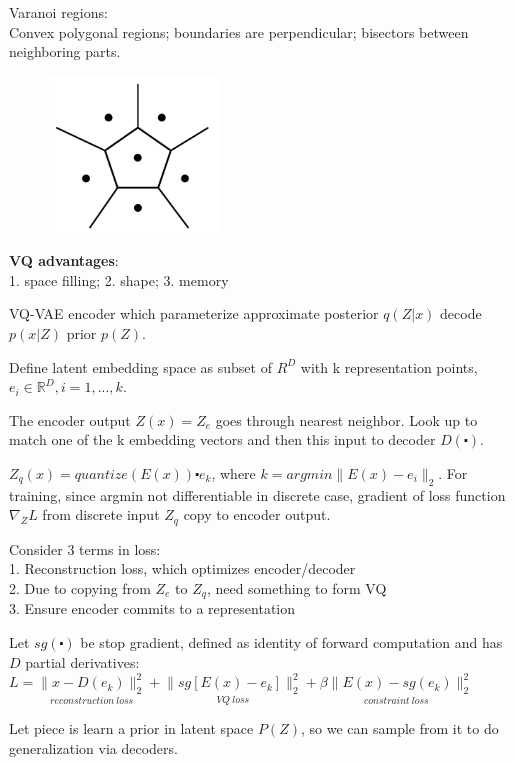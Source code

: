 \documentclass[12pt,a4paper]{article}
\begin{document}
Varanoi regions: \\
Convex polygonal regions; boundaries are perpendicular; bisectors between neighboring parts. 

\begin{figure}[!ht]
\centering
\includegraphics[width=0.4\textwidth]{fig/convex_poly_region.png}
\end{figure}

\textbf{VQ advantages}:\\
1. space filling; 2. shape; 3. memory

VQ-VAE encoder which parameterize approximate posterior $q(Z|x)$ decode $p(x|Z)$ prior $p(Z)$. 

Define latent embedding space as subset of $R^D$ with k representation points, $e_i\in \mathbb{R}^D, i=1,...,k$.

The encoder output $Z(x)=Z_e$ goes through nearest neighbor. Look up to match one of the k embedding vectors and then this input to decoder $D(\centerdot)$.

$Z_q(x)=quantize(E(x))\centerdot e_k$, where $k=argmin\|E(x)-e_i\|_2$. For training, since argmin not differentiable in discrete case, gradient of loss function $\nabla_Z L$ from discrete input $Z_q$ copy to encoder output. 

Consider 3 terms in loss: \\
1. Reconstruction loss, which optimizes encoder/decoder\\
2. Due to copying from $Z_e$ to $Z_q$, need something to form VQ \\
3. Ensure encoder commits to a representation

Let $sg(\centerdot)$ be stop gradient, defined as identity of forward computation and has $D$ partial derivatives:\\
$L=\underset{reconstruction\ loss}{\|x-D(e_k)\|^2_2} + \underset{VQ\ loss}{\|sg[E(x)-e_k]\|^2_2 }+ \underset{constraint\ loss}{\beta\|E(x)-sg(e_k)\|_2^2}$

Let piece is learn a prior in latent space $P(Z)$, so we can sample from it to do generalization via decoders. 
\end{document}
